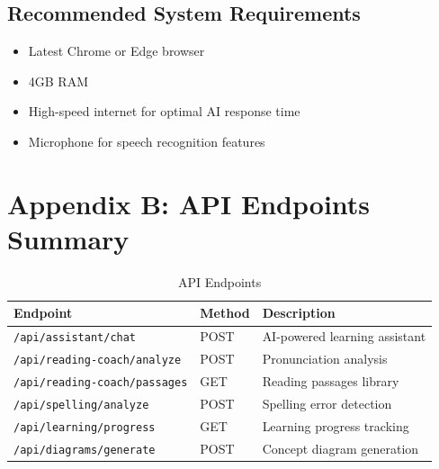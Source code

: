 \documentclass[journal]{IEEEtran}
\begin{document}
\subsection*{Recommended System Requirements}
\begin{itemize}
    \item Latest Chrome or Edge browser
    \item 4GB RAM
    \item High-speed internet for optimal AI response time
    \item Microphone for speech recognition features
\end{itemize}

\section*{Appendix B: API Endpoints Summary}

\begin{table}[h]
\centering
\caption{API Endpoints}
\begin{tabular}{@{}lll@{}}
\toprule
\textbf{Endpoint} & \textbf{Method} & \textbf{Description} \\ \midrule
\texttt{/api/assistant/chat} & POST & AI-powered learning assistant \\
\texttt{/api/reading-coach/analyze} & POST & Pronunciation analysis \\
\texttt{/api/reading-coach/passages} & GET & Reading passages library \\
\texttt{/api/spelling/analyze} & POST & Spelling error detection \\
\texttt{/api/learning/progress} & GET & Learning progress tracking \\
\texttt{/api/diagrams/generate} & POST & Concept diagram generation \\ \bottomrule
\end{tabular}
\end{table}
\end{document}
